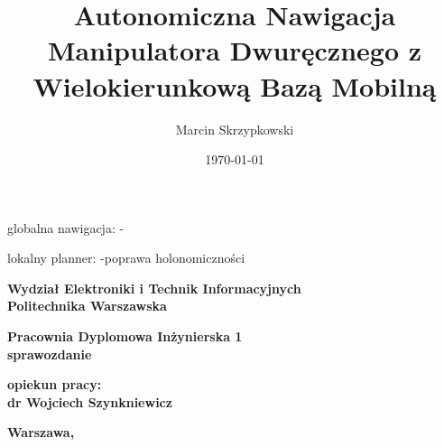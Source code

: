 \documentclass{report}
\title{Autonomiczna Nawigacja Manipulatora Dwuręcznego z Wielokierunkową Bazą Mobilną}
\date{\today}
\author{Marcin Skrzypkowski}
\begin{document}
	
	
	\makeatletter
	\renewcommand{\maketitle}{\begin{titlepage}
		\begin{center}{\LARGE {\bf Wydział Elektroniki i Technik Informacyjnych}}\\
			\vspace{0.4cm}
			{\LARGE {\bf Politechnika Warszawska}}\\
			\vspace{0.3cm}
		\end{center}
		\vspace{5cm}
		\begin{center}
			{\bf \LARGE Pracownia Dyplomowa Inżynierska  1\\ sprawozdanie  \vskip 0.1cm}
		\end{center}
		\vspace{1cm}
		\begin{center}
			{\bf \LARGE \@title}
		\end{center}
		\vspace{2cm}
		\begin{center}
			{\bf \Large \@author \par}
		\end{center}
		\vspace*{\stretch{1}}
		\begin{center}
			{\bf \large opiekun pracy: \\ dr Wojciech Szynkniewicz\par}
		\end{center}
		\vspace*{\stretch{5}}
		\begin{center}
			\bf{\large{Warszawa, \@date\vskip 0.1cm}}
		\end{center}
		\end{titlepage}
}
\makeatother	


globalna nawigacja:
	-
	
lokalny planner:
	-poprawa holonomiczności
	

	\maketitle
	\newpage



	\tableofcontents

	\newpage
	
	

	
		
	
	
		
\end{document}
